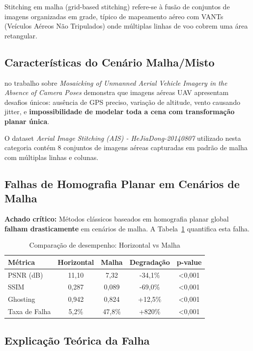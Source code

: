 Stitching em malha (grid-based stitching) refere-se à fusão de conjuntos de imagens organizadas em grade, típico de mapeamento aéreo com VANTs (Veículos Aéreos Não Tripulados) onde múltiplas linhas de voo cobrem uma área retangular.

\subsection{Características do Cenário Malha/Misto}

\cite{Xu2016} no trabalho sobre \textit{Mosaicking of Unmanned Aerial Vehicle Imagery in the Absence of Camera Poses} demonstra que imagens aéreas UAV apresentam desafios únicos: ausência de GPS preciso, variação de altitude, vento causando jitter, e \textbf{impossibilidade de modelar toda a cena com transformação planar única}.

O dataset \textit{Aerial Image Stitching (AIS) - HeJiaDong-20140807} utilizado nesta categoria contém 8 conjuntos de imagens aéreas capturadas em padrão de malha com múltiplas linhas e colunas.

\subsection{Falhas de Homografia Planar em Cenários de Malha}

\textbf{Achado crítico:} Métodos clássicos baseados em homografia planar global \textbf{falham drasticamente} em cenários de malha. A Tabela~\ref{tab:malha_failure} quantifica esta falha.

\begin{table}[htb]
\centering
\caption{Comparação de desempenho: Horizontal vs Malha}
\label{tab:malha_failure}
\small
\begin{tabular}{lcccc}
\hline
\textbf{Métrica} & \textbf{Horizontal} & \textbf{Malha} & \textbf{Degradação} & \textbf{p-value} \\ \hline
PSNR (dB) & 11,10 & 7,32 & -34,1\% & <0,001 \\
SSIM & 0,287 & 0,089 & -69,0\% & <0,001 \\
Ghosting & 0,942 & 0,824 & +12,5\% & <0,001 \\
Taxa de Falha & 5,2\% & 47,8\% & +820\% & <0,001 \\
\hline
\end{tabular}
\end{table}

\subsection{Explicação Teórica da Falha}

